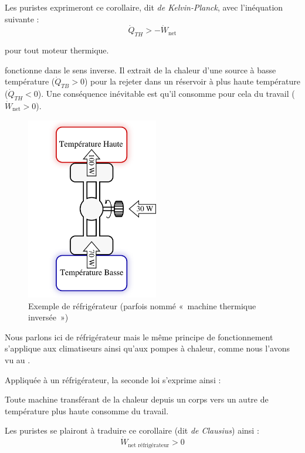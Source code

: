 \begin{description}
{		Les puristes exprimeront ce corollaire, dit \textit{de Kelvin-Planck}, avec l’inéquation suivante :
		\begin{equation}
			\dot{Q}_{TH} > -\dot{W}_\text{net}
		\end{equation}

		\begin{equationterms}
			\item pour tout moteur thermique.
		\end{equationterms}

	}%

	\clearfloats
	\item[Un réfrigérateur]{fonctionne dans le sens inverse. Il extrait de la chaleur d’une source à basse température ($\dot{Q}_{TB} > 0$) pour la rejeter dans un réservoir à plus haute température ($\dot{Q}_{TH} < 0$). Une conséquence inévitable est qu’il consomme pour cela du travail ($\dot{W}_\text{net} > 0$).



		\begin{figure}
			\begin{center}
				\includegraphics[height=8cm]{images/exemple_refrigerateur.png}
			\end{center}
			\caption{Exemple de réfrigérateur
		(parfois nommé «~machine thermique inversée~»)}
		\end{figure}

		Nous parlons ici de réfrigérateur mais le même principe de fonctionnement s’applique aux climatiseurs ainsi qu’aux pompes à chaleur, comme nous l’avons vu au \courssix.

		Appliquée à un réfrigérateur, la seconde loi s’exprime ainsi :

		\begin{trucimportant}
		Toute machine transférant de la chaleur depuis un corps vers un autre de température plus haute consomme du travail.
		\end{trucimportant}

		Les puristes se plairont à traduire ce corollaire (dit \textit{de Clausius}) ainsi :
		\begin{equation}
			\dot{W}_\text{net réfrigérateur} > 0
		\end{equation}

	}%
	\end{description}




